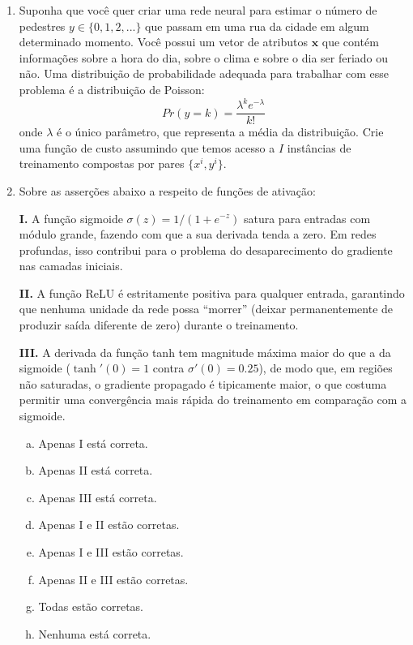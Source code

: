 \documentclass{dlproblemset}
\begin{document}
\begin{enumerate}[1)]
    \item {} Suponha que você quer criar uma rede neural para estimar o número de pedestres $y \in \{0,1,2,...\}$ que passam em uma rua da cidade em algum determinado momento. Você possui um vetor de atributos $\mathbf{x}$ que contém informações sobre a hora do dia, sobre o clima e sobre o dia ser feriado ou não.
    Uma distribuição de probabilidade adequada para trabalhar com esse problema é a distribuição de Poisson:
    \begin{equation*}
        Pr(y=k) = \frac{\lambda^ke^{-\lambda}}{k!}
    \end{equation*}
    \noindent onde $\lambda$ é o único parâmetro, que representa a média da distribuição.
    Crie uma função de custo assumindo que temos acesso a $I$ instâncias de treinamento compostas por pares $\{x^{i},y^{i}\}$.

    \item Sobre as asserções abaixo a respeito de funções de ativação:

    \textbf{I.} A função sigmoide $\sigma(z) = 1/(1 + e^{-z})$ satura para entradas com módulo grande, fazendo com que a sua derivada tenda a zero. Em redes profundas, isso contribui para o problema do desaparecimento do gradiente nas camadas iniciais.

    \textbf{II.} A função ReLU é estritamente positiva para qualquer entrada, garantindo que nenhuma unidade da rede possa ``morrer'' (deixar permanentemente de produzir saída diferente de zero) durante o treinamento.

    \textbf{III.} A derivada da função tanh tem magnitude máxima maior do que a da sigmoide ($\tanh'(0) = 1$ contra $\sigma'(0) = 0.25$), de modo que, em regiões não saturadas, o gradiente propagado é tipicamente maior, o que costuma permitir uma convergência mais rápida do treinamento em comparação com a sigmoide.

    \begin{enumerate}[(a)]
        \item Apenas I está correta.
        \item Apenas II está correta.
        \item Apenas III está correta.
        \item Apenas I e II estão corretas.
        \item Apenas I e III estão corretas.
        \item Apenas II e III estão corretas.
        \item Todas estão corretas.
        \item Nenhuma está correta.
    \end{enumerate}


\end{enumerate}
\end{document}
